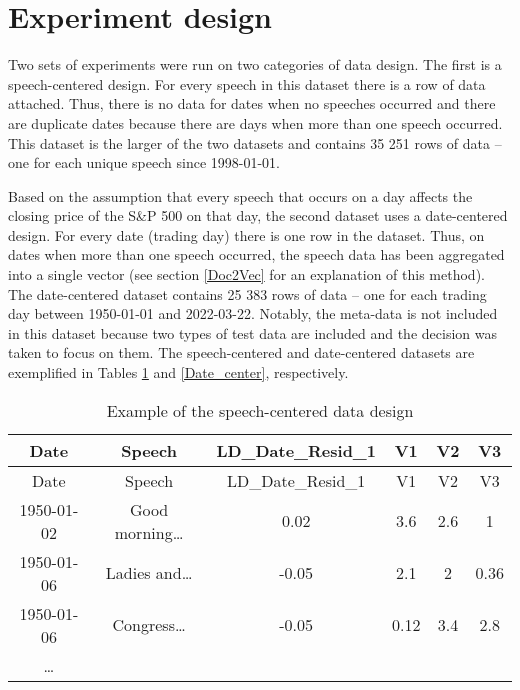 \documentclass[11pt,preprint, authoryear]{elsarticle}
\numberwithin{equation}{section}
\numberwithin{figure}{section}
\numberwithin{table}{section}
\begin{document}
\hypertarget{experiment-design}{%
\section{Experiment design}\label{experiment-design}}

Two sets of experiments were run on two categories of data design. The
first is a speech-centered design. For every speech in this dataset
there is a row of data attached. Thus, there is no data for dates when
no speeches occurred and there are duplicate dates because there are
days when more than one speech occurred. This dataset is the larger of
the two datasets and contains 35 251 rows of data -- one for each unique
speech since 1998-01-01.

Based on the assumption that every speech that occurs on a day affects
the closing price of the S\&P 500 on that day, the second dataset uses a
date-centered design. For every date (trading day) there is one row in
the dataset. Thus, on dates when more than one speech occurred, the
speech data has been aggregated into a single vector (see section
\ref{Doc2Vec} for an explanation of this method). The date-centered
dataset contains 25 383 rows of data -- one for each trading day between
1950-01-01 and 2022-03-22. Notably, the meta-data is not included in
this dataset because two types of test data are included and the
decision was taken to focus on them. The speech-centered and
date-centered datasets are exemplified in Tables \ref{Speech_center} and
\ref{Date_center}, respectively.

\begin{longtable}[]{@{}cccccc@{}}
\caption{Example of the speech-centered data design
\label{Speech_center}}\tabularnewline
\toprule()
Date & Speech & LD\_Date\_Resid\_1 & V1 & V2 & V3 \\
\midrule()
\endfirsthead
\toprule()
Date & Speech & LD\_Date\_Resid\_1 & V1 & V2 & V3 \\
\midrule()
\endhead
1950-01-02 & Good morning\ldots{} & 0.02 & 3.6 & 2.6 & 1 \\
1950-01-06 & Ladies and\ldots{} & -0.05 & 2.1 & 2 & 0.36 \\
1950-01-06 & Congress\ldots{} & -0.05 & 0.12 & 3.4 & 2.8 \\
\ldots{} & & & & & \\
\bottomrule()
\end{longtable}
\end{document}

